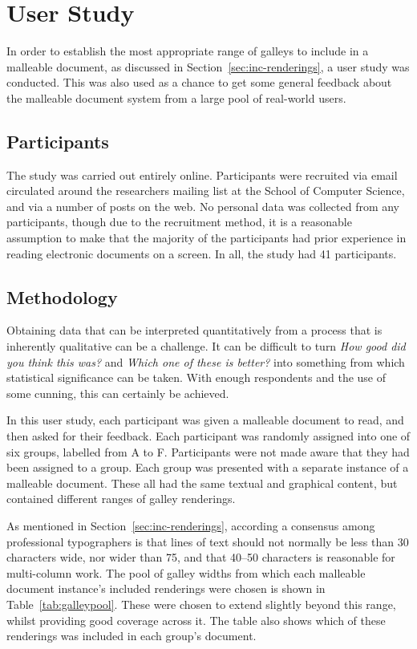 \section{User Study}
\label{sec:survey}
In order to establish the most appropriate range of \glspl{galley} to include in a malleable document, as discussed in Section~\ref{sec:inc-renderings}, a user study was conducted. This was also used as a chance to get some general feedback about the malleable document system from a large pool of real-world users.

\subsection{Participants}
The study was carried out entirely online. Participants were recruited via email circulated around the researchers mailing list at the School of Computer Science, and via a number of posts on the web. No personal data was collected from any participants, though due to the recruitment method, it is a reasonable assumption to make that the majority of the participants had prior experience in reading electronic documents on a screen. In all, the study had 41 participants.

\subsection{Methodology}
Obtaining data that can be interpreted quantitatively from a process that is inherently qualitative can be a challenge. It can be difficult to turn \emph{How good did you think this was?} and \emph{Which one of these is better?} into something from which statistical significance can be taken. With enough respondents and the use of some cunning, this can certainly be achieved.

In this user study, each participant was given a malleable document to read, and then asked for their feedback. Each participant was randomly assigned into one of six groups, labelled from A to F. Participants were not made aware that they had been assigned to a group. Each group was presented with a separate instance of a malleable document. These all had the same textual and graphical content, but contained different ranges of \gls{galley} renderings.

As mentioned in Section~\ref{sec:inc-renderings}, according a consensus among professional typographers is that lines of text should not normally be less than 30 characters wide, nor wider than 75, and that 40--50 characters is reasonable for multi-column work. The pool of \gls{galley} widths from which each malleable document instance's included renderings were chosen is shown in Table~\ref{tab:galleypool}. These were chosen to extend slightly beyond this range, whilst providing good coverage across it. The table also shows which of these renderings was included in each group's document.

